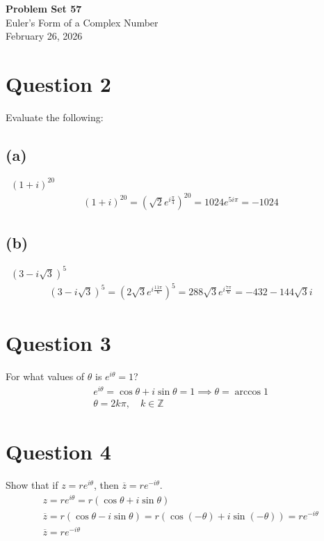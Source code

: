 \documentclass[12pt]{article}
\begin{document}
\vspace*{0cm}

\begin{center}
    {\Large \bfseries Problem Set 57} \\[0.5cm]
    {\large Euler's Form of a Complex Number} \\[0.35cm]
    {\normalsize February 26, 2026}
\end{center}


\section{Question 2}
Evaluate the following:

\vspace{0.3em}
\subsection{(a)} \, $(1+i)^{20}$
\begin{gather*}
    (1+i)^{20}=(\sqrt{2}e^{i\frac{\pi}{4}})^{20}=1024e^{5i\pi}=\boxed{-1024}
\end{gather*}

\subsection{(b)} \, $(3-i\sqrt{3})^5$
\begin{gather*}
    (3-i\sqrt{3})^5=(2\sqrt{3}e^{i\frac{11\pi}{6}})^5=288\sqrt{3}e^{i\frac{7\pi}{6}}=\boxed{-432-144\sqrt{3}i}
\end{gather*}

\section{Question 3}
For what values of $\theta$ is $e^{i\theta}=1$?
\begin{gather*}
    e^{i\theta}=\cos \theta + i\sin \theta=1 \implies \theta=\arccos1\\
    \boxed{\theta=2k\pi,\quad k\in\mathbb{Z}}
\end{gather*}

\section{Question 4}
Show that if $z=re^{i\theta}$, then $\overline{z}=re^{-i\theta}$.
\begin{gather*}
    z=re^{i\theta}=r(\cos \theta + i\sin \theta)\\
    \overline{z}=r(\cos \theta -i\sin \theta) = r(\cos (-\theta)+i \sin (-\theta)) = re^{-i\theta}\\
    \boxed{\overline{z}=re^{-i\theta}}
\end{gather*}
\end{document}
